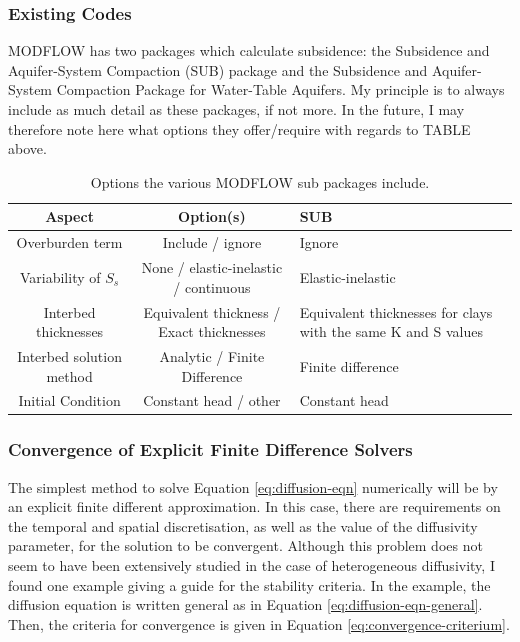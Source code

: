 \documentclass{article}
\begin{document}
\subsubsection{Existing Codes}

MODFLOW has two packages which calculate subsidence: the Subsidence and Aquifer-System Compaction (SUB) package and the Subsidence and Aquifer-System Compaction Package for Water-Table Aquifers. My principle is to always include as much detail as these packages, if not more. In the future, I may therefore note here what options they offer/require with regards to TABLE above.

\begin{table}[h]
\centering
\begin{tabular}{|c|c|p{4cm}|} 
\hline
\textbf{Aspect} & \textbf{Option(s)} & \textbf{SUB} \\ 
\hline
Overburden term & Include / ignore & Ignore \\
Variability of $S_s$ & None / elastic-inelastic / continuous & Elastic-inelastic  \\
Interbed thicknesses & Equivalent thickness / Exact thicknesses & Equivalent thicknesses for clays with the same K and S values \\
Interbed solution method & Analytic / Finite Difference & Finite difference \\
Initial Condition & Constant head / other & Constant head \\ 
\hline 
\end{tabular}
\caption{Options the various MODFLOW sub packages include.}
\label{table:diffn-options}
\end{table}

\subsubsection{Convergence of Explicit Finite Difference Solvers}
\label{sec:Convergence_gwflow}

The simplest method to solve Equation \ref{eq:diffusion-eqn} numerically will be by an explicit finite different approximation. In this case, there are requirements on the temporal and spatial discretisation, as well as the value of the diffusivity parameter, for the solution to be convergent. Although this problem does not seem to have been extensively studied in the case of heterogeneous diffusivity, I found one example giving a guide for the stability criteria. In the example, the diffusion equation is written general as in Equation \ref{eq:diffusion-eqn-general}. Then, the criteria for convergence is given in Equation \ref{eq:convergence-criterium}.
\end{document}
